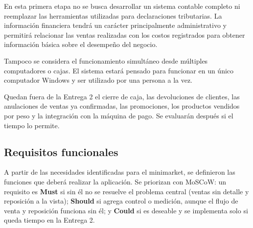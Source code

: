 \documentclass[10pt,a4paper]{article}
\begin{document}
\begin{itemize}
En esta primera etapa no se busca desarrollar un sistema contable completo ni reemplazar las herramientas utilizadas para declaraciones tributarias. La información financiera tendrá un carácter principalmente administrativo y permitirá relacionar las ventas realizadas con los costos registrados para obtener información básica sobre el desempeño del negocio.

Tampoco se considera el funcionamiento simultáneo desde múltiples computadores o cajas. El sistema estará pensado para funcionar en un único computador Windows y ser utilizado por una persona a la vez.

Quedan fuera de la Entrega 2 el cierre de caja, las devoluciones de clientes, las anulaciones de ventas ya confirmadas, las promociones, los productos vendidos por peso y la integración con la máquina de pago. Se evaluarán después si el tiempo lo permite.

\end{itemize}

\subsection{Requisitos funcionales}

A partir de las necesidades identificadas para el minimarket, se definieron las funciones que deberá realizar la aplicación. Se priorizan con MoSCoW: un requisito es \textbf{Must} si sin él no se resuelve el problema central (ventas sin detalle y reposición a la vista); \textbf{Should} si agrega control o medición, aunque el flujo de venta y reposición funciona sin él; y \textbf{Could} si es deseable y se implementa solo si queda tiempo en la Entrega 2.
\end{document}
